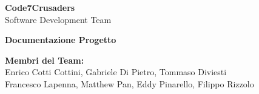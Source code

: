\documentclass{article}
\begin{document}
\begin{titlepage}
    {\Huge \textbf{Code7Crusaders}}\\
    \vspace{0.5cm}
    {\Large Software Development Team}\\
    \vspace{2cm}
    
    {\large \textbf{Documentazione Progetto}}\\
    \vspace{5cm}

    \textbf{Membri del Team:}\\
    Enrico Cotti Cottini, Gabriele Di Pietro, Tommaso Diviesti \\
    Francesco Lapenna, Matthew Pan, Eddy Pinarello, Filippo Rizzolo \\
    \vspace{0.5cm}
    
    \vspace{1cm}
\end{titlepage}

\newpage
\tableofcontents
\end{document}
